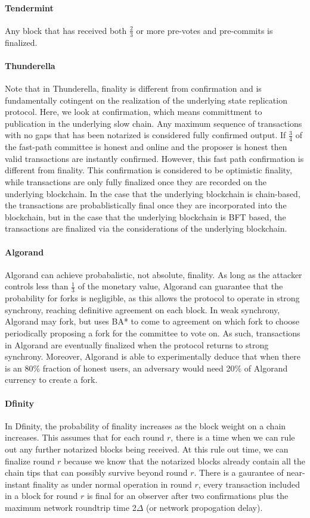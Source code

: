 \documentclass[10pt,journal,compsoc]{IEEEtran}
\begin{document}
\paragraph{Tendermint} Any block that has received both \(\frac{2}{3}\) or more pre-votes and pre-commits is finalized. 

\paragraph{Thunderella} Note that in Thunderella, finality is different from confirmation and is fundamentally cotingent on the realization of the underlying state replication protocol. Here, we look at confirmation, which means committment to publication in the underlying slow chain. Any maximum sequence of transactions with no gaps that has been notarized is considered fully confirmed output. If \(\frac{3}{4}\) of the fast-path committee is honest and online and the proposer is honest then valid transactions are instantly confirmed. However, this fast path confirmation is different from finality. This confirmation is considered to be optimistic finality, while transactions are only fully finalized once they are recorded on the underlying blockchain. In the case that the underlying blockchain is chain-based, the transactions are probablistically final once they are incorporated into the blockchain, but in the case that the underlying blockchain is BFT based, the transactions are finalized via the considerations of the underlying blockchain.

\paragraph{Algorand} Algorand can achieve probabalistic, not absolute, finality. As long as the attacker controls less than \(\frac{1}{3}\) of the monetary value, Algorand can guarantee that the probability for forks is negligible, as this allows the protocol to operate in strong synchrony, reaching definitive agreement on each block. In weak synchrony, Algorand may fork, but uses BA* to come to agreement on which fork to choose periodically proposing a fork for the committee to vote on. As such, transactions in Algorand are eventually finalized when the protocol returns to strong synchrony. Moreover, Algorand is able to experimentally deduce that when there is an 80\% fraction of honest users, an adversary would need 20\% of Algorand currency to create a fork.

\paragraph{Dfinity}
In Dfinity, the probability of finality increases as the block weight on a chain increases. This assumes that for each round $r$, there is a time when we can rule out any further notarized blocks being received. At this rule out time, we can finalize round $r$ because we know that the notarized blocks already contain all the chain tips that can possibly survive beyond round $r$. There is a gaurantee of near-instant finality as under normal operation in round $r$, every transaction included in a block for round $r$ is final for an observer after two confirmations plus the maximum network roundtrip time 2$\Delta$ (or network propogation delay).	
\end{document}
